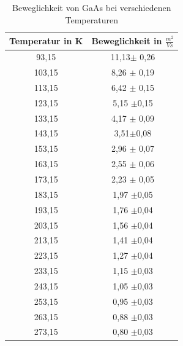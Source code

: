 \begin{table}[]
    \centering
    \begin{tabular}{c|c}
    \hline
         Temperatur in K & Beweglichkeit in $\frac{m^2}{Vs}$\\
         \hline
         93,15& 11,13$\pm$ 0,26\\
         103,15&8,26 $\pm$ 0,19   \\
         113,15&6,42   $ \pm$ 0,15    \\
         123,15&5,15   $\pm $0,15     \\
         133,15&4,17    $\pm $ 0,09   \\
         143,15&3,51$\pm $0,08        \\
         153,15&2,96  $ \pm$ 0,07     \\
         163,15&2,55    $ \pm$ 0,06   \\
         173,15&2,23     $\pm$ 0,05   \\
         183,15&1,97   $\pm $0,05     \\
         193,15&1,76  $\pm $0,04      \\
         203,15&1,56   $\pm $0,04     \\
         213,15&1,41   $\pm$0,04     \\
         223,15&1,27   $\pm $0,04     \\
         233,15&1,15    $ \pm$0,03   \\
         243,15&1,05   $\pm $0,03     \\
         253,15&0,95    $ \pm$0,03   \\
         263,15&0,88    $\pm $0,03    \\
         273,15&0,80    $\pm $0,03    \\
         \hline
    \end{tabular}
    \caption{Beweglichkeit von GaAs bei verschiedenen Temperaturen}
    \label{tab:GaAs_web}
\end{table}
